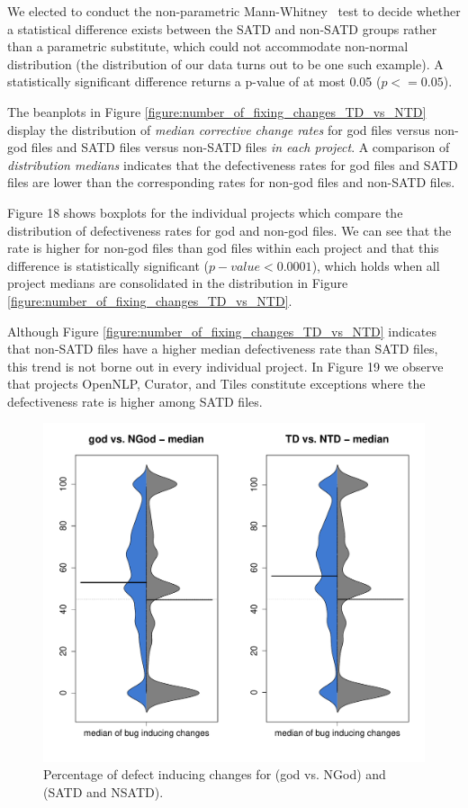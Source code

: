 We elected to conduct the non-parametric Mann-Whitney~\cite{mann1947test} test to decide whether a statistical difference exists between the SATD and non-SATD groups rather than a parametric substitute, which could not accommodate non-normal distribution (the distribution of our data turns out to be one such example). A statistically significant difference returns a p-value of at most 0.05 ($p <= 0.05$). 



The beanplots in Figure \ref{figure:number_of_fixing_changes_TD_vs_NTD} display the distribution of \textit{median corrective change rates} for god files versus non-god files and SATD files versus non-SATD files \textit{in each project}. A comparison of \textit{distribution medians} indicates that the defectiveness rates for god files and SATD files are lower than the corresponding rates for non-god files and non-SATD files.

Figure 18 shows boxplots for the individual projects which compare the distribution of defectiveness rates for god and non-god files. We can see that the rate is higher for non-god files than god files within each project and that this difference is statistically significant ($p-value < 0.0001$), which holds when all project medians are consolidated in the distribution in Figure \ref{figure:number_of_fixing_changes_TD_vs_NTD}.

Although Figure \ref{figure:number_of_fixing_changes_TD_vs_NTD} indicates that non-SATD files have a higher median defectiveness rate than SATD files, this trend is not borne out in every individual project. In Figure 19 we observe that projects OpenNLP, Curator, and Tiles constitute exceptions where the defectiveness rate is higher among SATD files.


\begin{figure}[tb!]
	\centering
	\includegraphics[width=140mm]{figures/chapter4/rq2_distrubtion_god_and_td}
	\caption{Percentage of defect inducing changes for (god vs. NGod) and (SATD and NSATD).}
	\label{figure:bug_inducing_changes}
\end{figure}

